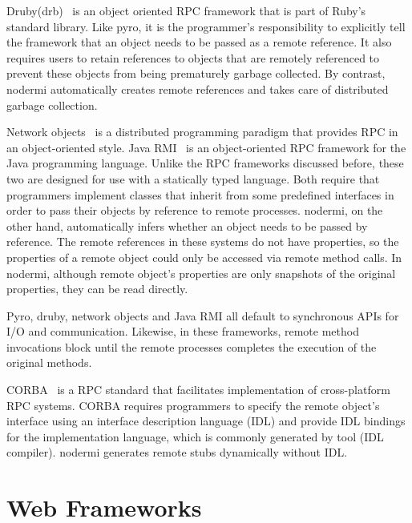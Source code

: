 Druby(drb)~\cite{druby} is an object oriented RPC framework that is part of Ruby's standard
library. Like pyro, it is the programmer's responsibility to explicitly tell
the framework that an object needs to be passed as a remote reference. It also
requires users to retain references to objects that are remotely
referenced  to prevent these objects from being prematurely garbage collected.
By contrast, nodermi automatically creates remote references and
takes care of distributed garbage collection.

Network objects~\cite{birrell1993distributed} is a distributed programming
paradigm that provides RPC in an object-oriented style. Java RMI~\cite{j2eedoc}
is an object-oriented RPC framework for the Java programming language. Unlike the
RPC frameworks discussed before, these two are designed for use with a statically typed language.
Both require that programmers implement classes that inherit from some
predefined interfaces in order to pass their objects by reference to remote processes.
nodermi, on the other hand, automatically infers whether an object needs to be 
passed by reference.  The remote references in these systems do not
have properties, so the properties of a remote object could only be accessed
via remote method calls. In nodermi, 
although remote object's properties are only snapshots of the original properties, 
they can be read directly.


Pyro, druby, network objects and Java RMI all default to synchronous
APIs for I/O and communication.  Likewise, in these frameworks, remote method invocations 
block until the remote processes completes the execution of the original methods.


CORBA~\cite{vinoski1997corba} is a RPC standard that facilitates implementation
of cross-platform RPC systems. CORBA requires programmers to specify  the
remote object's interface using an interface description language (IDL) and 
provide IDL bindings for the implementation language, which is commonly generated 
by tool (IDL compiler). nodermi generates remote stubs dynamically without IDL.

\section{Web Frameworks}



